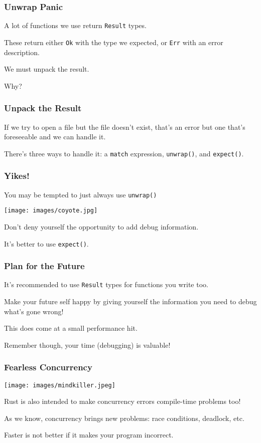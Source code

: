 \begin{frame}
\frametitle{Unwrap Panic}

A lot of functions we use return \texttt{Result} types.


These return either \texttt{Ok} with the type we expected, or \texttt{Err} with an error description.

We must unpack the result.

Why?

\end{frame}



\begin{frame}
\frametitle{Unpack the Result}

If we try to open a file but the file doesn't exist, that's an error but one that's foreseeable and we can handle it. 

There's three ways to handle it: a \texttt{match} expression, \texttt{unwrap()}, and \texttt{expect()}. 


\end{frame}


\begin{frame}
\frametitle{Yikes!}

You may be tempted to just always use \texttt{unwrap()}

\begin{center}
	\texttt{[image: images/coyote.jpg]}
\end{center}

Don't deny yourself the opportunity to add debug information.

It's better to use \texttt{expect()}.

\end{frame}


\begin{frame}
\frametitle{Plan for the Future}

It's recommended to use \texttt{Result} types for functions you write too. 

Make your future self happy by giving yourself the information you need to debug what's gone wrong!

This does come at a small performance hit. 

Remember though, your time (debugging) is valuable!

\end{frame}


\begin{frame}
\frametitle{Fearless Concurrency}

\begin{center}
	\texttt{[image: images/mindkiller.jpeg]}
\end{center}

Rust is also intended to make concurrency errors compile-time problems too! 

As we know, concurrency brings new problems: race conditions, deadlock, etc.

Faster is not better if it makes your program incorrect.

\end{frame}

